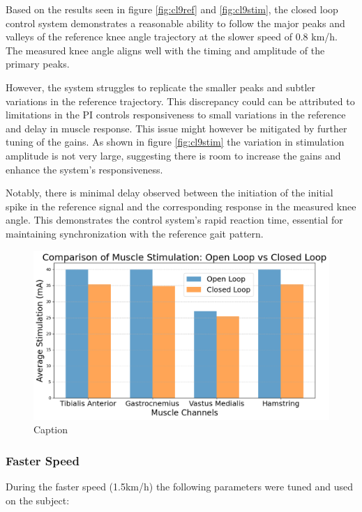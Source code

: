 Based on the results seen in figure \ref{fig:cl9ref} and \ref{fig:cl9stim}, the closed loop control system demonstrates a reasonable ability to follow the major peaks and valleys of the reference knee angle trajectory at the slower speed of 0.8 km/h. The measured knee angle aligns well with the timing and amplitude of the primary peaks. 

However, the system struggles to replicate the smaller peaks and subtler variations in the reference trajectory. This discrepancy could can be attributed to limitations in the PI controls responsiveness to small variations in the reference and delay in muscle response. This issue might however be mitigated by further tuning of the gains. As shown in figure \ref{fig:cl9stim} the variation in stimulation amplitude is not very large, suggesting there is room to increase the gains and enhance the system's responsiveness.

Notably, there is minimal delay observed between the initiation of the initial spike in the reference signal and the corresponding response in the measured knee angle. This demonstrates the control system's rapid reaction time, essential for maintaining synchronization with the reference gait pattern.

\begin{figure} [H]
    \centering
    \includegraphics[width=0.8\linewidth]{images/stimulationclvsol.png}
    \caption{Caption}
    \label{fig:enter-label}
\end{figure}

\subsubsection{Faster Speed}
During the faster speed (1.5km/h) the following parameters were tuned and used on the subject:

